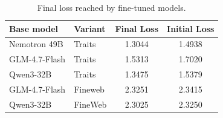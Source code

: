 \begin{table}[t]
    \centering
    \small
    \caption{Final loss reached by fine-tuned models.}
    \label{tab:loss}
    \begin{tabular}{@{}llcc@{}}
        \toprule
        Base model & Variant & Final Loss & Initial Loss\\
        \midrule
        Nemotron 49B &  Traits &  1.3044 & 1.4938 \\
        GLM-4.7-Flash & Traits &  1.5313 & 1.7020\\
        Qwen3-32B & Traits &  1.3475 & 1.5379 \\
        \midrule
        GLM-4.7-Flash & Fineweb & 2.3251 & 2.3415 \\
        Qwen3-32B & FineWeb &  2.3025 & 2.3250\\
        \bottomrule
    \end{tabular}
\end{table}


